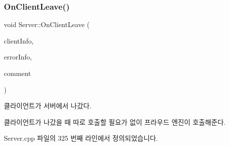 \subsubsection{\texorpdfstring{On\+Client\+Leave()}{OnClientLeave()}}
{\footnotesize\ttfamily void Server\+::\+On\+Client\+Leave (\begin{DoxyParamCaption}\item[{C\+Net\+Client\+Info $\ast$}]{client\+Info,  }\item[{Error\+Info $\ast$}]{error\+Info,  }\item[{const Byte\+Array \&}]{comment }\end{DoxyParamCaption})}



클라이언트가 서버에서 나갔다. 

클라이언트가 나갔을 때  따로 호출할 필요가 없이 프라우드 엔진이 호출해준다. 

Server.\+cpp 파일의 325 번째 라인에서 정의되었습니다.


